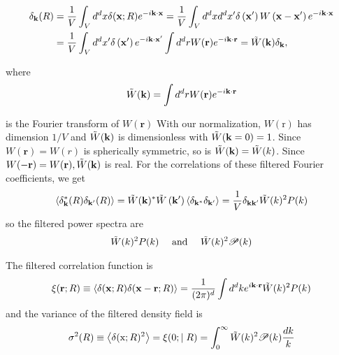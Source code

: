 \begin{appendices}
\begin{align}
    \delta_{\mathbf{k}}(R) & =\frac{1}{V} \int_V d^d x \delta(\mathbf{x} ; R) e^{-i \mathbf{k} \cdot \mathbf{x}}=\frac{1}{V} \int_V d^d x d^d x^{\prime} \delta\left(\mathbf{x}^{\prime}\right) W\left(\mathbf{x}-\mathbf{x}^{\prime}\right) e^{-i \mathbf{k} \cdot \mathbf{x}} \\
    & =\frac{1}{V} \int_V d^d x^{\prime} \delta\left(\mathbf{x}^{\prime}\right) e^{-i \mathbf{k} \cdot \mathbf{x}^{\prime}} \int d^d r W(\mathbf{r}) e^{-i \mathbf{k} \cdot \mathbf{r}}=\Tilde{W}(\mathbf{k}) \delta_{\mathbf{k}},
\end{align}

where
\begin{align}
    \Tilde{W}(\mathbf{k})=\int d^d r W(\mathbf{r}) e^{-i \mathbf{k} \cdot \mathbf{r}}
\end{align}

is the Fourier transform of $W(\mathbf{r})$ With our normalization, $W(\mathrm{r})$ has dimension $1 / V$ and $\Tilde{W}(\mathbf{k})$ is dimensionless with $\Tilde{W}(\mathbf{k}=0)=1$. Since $W(\mathbf{r})=W(r)$ is spherically symmetric, so is $\Tilde{W}(\mathbf{k})= \Tilde{W}(k)$. Since $W(-\mathbf{r})=W(\mathbf{r}), \Tilde{W}(\mathbf{k})$ is real.
For the correlations of these filtered Fourier coefficients, we get
\begin{align}
    \left\langle\delta_{\mathbf{k}}^*(R) \delta_{\mathbf{k}^{\prime}}(R)\right\rangle=\Tilde{W}(\mathbf{k})^* \Tilde{W}\left(\mathbf{k}^{\prime}\right)\left\langle\delta_{\mathbf{k}^*} \delta_{\mathbf{k}^{\prime}}\right\rangle=\frac{1}{V} \delta_{\mathbf{k k}^{\prime}} \Tilde{W}(k)^2 P(k)
\end{align}
so the filtered power spectra are
\begin{align}
    \Tilde{W}(k)^2 P(k) \quad \text { and } \quad \Tilde{W}(k)^2 \mathcal{P}(k)
\end{align}

The filtered correlation function is
\begin{align}
    \xi(\mathbf{r} ; R) \equiv\langle\delta(\mathbf{x} ; R) \delta(\mathbf{x}-\mathbf{r} ; R)\rangle=\frac{1}{(2 \pi)^d} \int d^d k e^{i \mathbf{k} \cdot \mathbf{r}}  \Tilde{W}(k)^2 P(k)
\end{align}
and the variance of the filtered density field is
\begin{align}
    \sigma^2(R) \equiv\left\langle\delta(\mathrm{x} ; R)^2\right\rangle=\xi(0 ; \mid R)=\int_0^{\infty}  \Tilde{W}(k)^2 \mathcal{P}(k) \frac{d k}{k}
\end{align}


\end{appendices}
